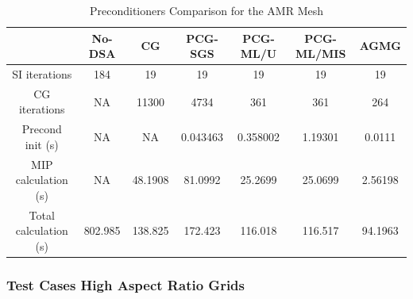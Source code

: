 \documentclass[preprint,10pt]{elsarticle}
\renewcommand{\(}{\left(}
\renewcommand{\)}{\right)}
\renewcommand{\[}{\left[}
\renewcommand{\]}{\right]}
\begin{document}
\begin{table}[H]
  \caption{Preconditioners Comparison for the AMR Mesh}
  \begin{center}
    \begin{tabular}{|c|c|c|c|c|c|c|}
      \hline
       & No-DSA & CG & PCG-SGS & PCG-ML/U & PCG-ML/MIS & AGMG \\
      \hline
   SI iterations & 184     & 19      & 19       & 19      & 19       & 19 \\
   CG iterations & NA      & 11300   & 4734     & 361     & 361      & 264 \\
\hline
Precond init (s)     & NA      & NA      & 0.043463 & 0.358002 & 1.19301 & 0.0111\\
MIP calculation (s)  & NA   & 48.1908 & 81.0992  & 25.2699 & 25.0699  &    2.56198\\
Total calculation (s)& 802.985 & 138.825 & 172.423  & 116.018 & 116.517  &  94.1963\\
      \hline
    \end{tabular}
    \label{table_amr}
  \end{center}
\end{table}

\subsubsection{Test Cases High Aspect Ratio Grids}
\end{document}
